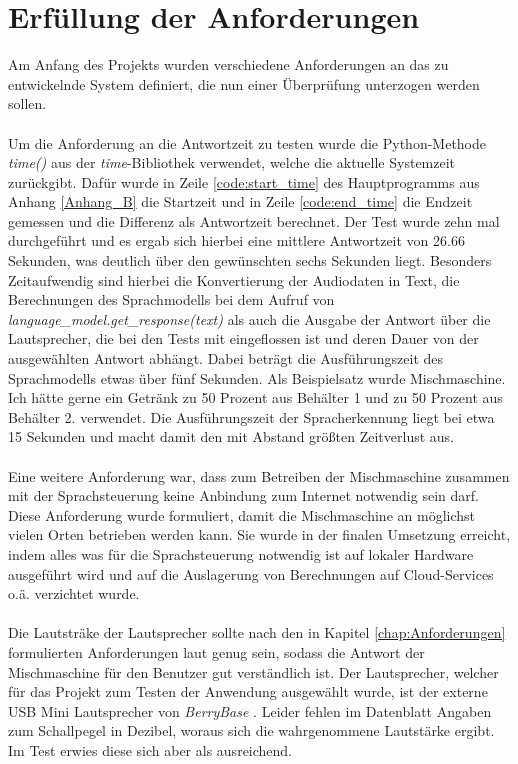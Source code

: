 \section{Erfüllung der Anforderungen}
Am Anfang des Projekts wurden verschiedene Anforderungen an das zu entwickelnde System definiert, die nun einer Überprüfung unterzogen werden sollen.\\\\
Um die Anforderung an die Antwortzeit zu testen wurde die Python-Methode \textit{time()} aus der \textit{time}-Bibliothek verwendet, welche die aktuelle Systemzeit zurückgibt. Dafür wurde in Zeile \ref{code:start_time} des Hauptprogramms aus Anhang \ref{Anhang_B} die Startzeit und in Zeile \ref{code:end_time} die Endzeit gemessen und die Differenz als Antwortzeit berechnet. Der Test wurde zehn mal durchgeführt und es ergab sich hierbei eine mittlere Antwortzeit von 26.66 Sekunden, was deutlich über den gewünschten sechs Sekunden liegt. Besonders Zeitaufwendig sind hierbei die Konvertierung der Audiodaten in Text, die Berechnungen des Sprachmodells bei dem Aufruf von \textit{language\_model.get\_response(text)} als auch die Ausgabe der Antwort über die Lautsprecher, die bei den Tests mit eingeflossen ist und deren Dauer von der ausgewählten Antwort abhängt. Dabei beträgt die Ausführungszeit des Sprachmodells etwas über fünf Sekunden. Als Beispielsatz wurde \glqq{}Mischmaschine. Ich hätte gerne ein Getränk zu 50 Prozent aus Behälter 1 und zu 50 Prozent aus Behälter 2.\grqq{} verwendet. Die Ausführungszeit der Spracherkennung liegt bei etwa 15 Sekunden und macht damit den mit Abstand größten Zeitverlust aus.\\\\
Eine weitere Anforderung war, dass zum Betreiben der Mischmaschine zusammen mit der Sprachsteuerung keine Anbindung zum Internet notwendig sein darf. Diese Anforderung wurde formuliert, damit die Mischmaschine an möglichst vielen Orten betrieben werden kann. Sie wurde in der finalen Umsetzung erreicht, indem alles was für die Sprachsteuerung notwendig ist auf lokaler Hardware ausgeführt wird und auf die Auslagerung von Berechnungen auf Cloud-Services o.ä. verzichtet wurde.\\\\
Die Lautsträke der Lautsprecher sollte nach den in Kapitel \ref{chap:Anforderungen} formulierten Anforderungen laut genug sein, sodass die Antwort der Mischmaschine für den Benutzer gut verständlich ist. Der Lautsprecher, welcher für das Projekt zum Testen der Anwendung ausgewählt wurde, ist der externe USB Mini Lautsprecher von \textit{BerryBase} \cite{berrybase_speaker}. Leider fehlen im Datenblatt Angaben zum Schallpegel in Dezibel, woraus sich die wahrgenommene Lautstärke ergibt. Im Test erwies diese sich aber als ausreichend.\\\\
